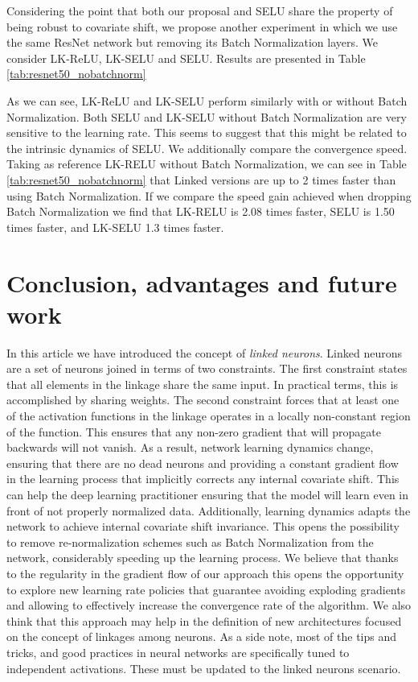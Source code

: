 \documentclass[10pt,twocolumn,letterpaper]{article}
\begin{document}
Considering the point that both our proposal and SELU share the property of being robust to covariate shift, we propose another experiment in which we use the same ResNet network but removing its Batch Normalization layers. We consider LK-ReLU, LK-SELU and SELU.  Results are presented in Table \ref{tab:resnet50_nobatchnorm}

As we can see, LK-ReLU and LK-SELU perform similarly with or without Batch Normalization. Both SELU and LK-SELU without Batch Normalization are very sensitive to the learning rate. This seems to suggest that this might be related to the intrinsic dynamics of SELU. We additionally compare the convergence speed. Taking as reference LK-RELU without Batch Normalization, we can see in Table \ref{tab:resnet50_nobatchnorm} that Linked versions are up to 2 times faster than using Batch Normalization. If we compare the speed gain achieved when dropping Batch Normalization we find that LK-RELU is 2.08 times faster, SELU is 1.50 times faster, and LK-SELU 1.3 times faster. 

\section{Conclusion, advantages and future work}\label{sec:conclusions}


In this article we have introduced the concept of {\it linked neurons}. Linked neurons are a set of neurons joined in terms of two constraints. The first constraint states that all elements in the linkage share the same input. In practical terms, this is accomplished by sharing weights. The second constraint forces that at least one of the activation functions in the linkage operates in a locally non-constant region of the function. This ensures that any non-zero gradient that will propagate backwards will not vanish. As a result, network learning dynamics change, ensuring that there are no dead neurons and providing a constant gradient flow in the learning process that implicitly corrects any internal covariate shift. This can help the deep learning practitioner ensuring that the model will learn even in front of not properly normalized data. Additionally, learning dynamics adapts the network to achieve internal covariate shift invariance. This opens the possibility to remove re-normalization schemes such as Batch Normalization from the network, considerably speeding up the learning process. We believe that thanks to the regularity in the gradient flow of our approach this opens the opportunity to explore new learning rate policies that guarantee avoiding exploding gradients and allowing to effectively increase the convergence rate of the algorithm. We also think that this approach may help in the definition of new architectures focused on the concept of linkages among neurons. As a side note, most of the tips and tricks, and good practices in neural networks are specifically tuned to independent activations. These must be updated to the linked neurons scenario. 


{\small


}
\end{document}
